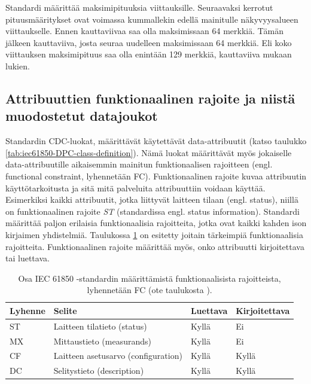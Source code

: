 Standardi määrittää maksimipituuksia viittauksille. Seuraavaksi kerrotut pituusmääritykset ovat voimassa kummallekin edellä mainitulle näkyvyysalueen viittaukselle. Ennen kauttaviivaa saa olla maksimissaan 64 merkkiä. Tämän jälkeen kauttaviiva, josta seuraa uudelleen maksimissaan 64 merkkiä. Eli koko viittauksen maksimipituus saa olla enintään 129 merkkiä, kauttaviiva mukaan lukien. \mbox{\cite[s.~24,183]{IEC61850-7-2}}


\subsection{Attribuuttien funktionaalinen rajoite ja niistä muodostetut datajoukot}
\label{ch:fc-and-dataset}
Standardin CDC-luokat, määrittävät käytettävät data-attribuutit (katso taulukko \ref{tab:iec61850-DPC-class-definition}). Nämä luokat määrittävät myös jokaiselle data-attribuutille aikaisemmin mainitun funktionaalisen rajoitteen (engl. functional constraint, lyhennetään FC). Funktionaalinen rajoite kuvaa attribuutin käyttötarkoitusta ja sitä mitä palveluita attribuuttiin voidaan käyttää. Esimerkiksi kaikki attribuutit, jotka liittyvät laitteen tilaan (engl. status), niillä on funktionaalinen rajoite \emph{ST} (standardissa engl. status information). Standardi määrittää paljon erilaisia funktionaalisia rajoitteita, jotka ovat kaikki kahden ison kirjaimen yhdistelmiä. Taulukossa \ref{tab:iec61850-functional-constraints} on esitetty joitain tärkeimpiä funktionaalisia rajoitteita. Funktionaalinen rajoite määrittää myös, onko attribuutti kirjoitettava tai luettava.

\begin{table}[ht!]
	\caption{Osa IEC 61850 -standardin määrittämistä funktionaalisista rajoitteista, lyhennetään FC (ote taulukosta \mbox{\cite[s.~54]{IEC61850-7-2}}).}
	\label{tab:iec61850-functional-constraints}
	\begin{tabular}{l | l | l | l}
		\hline
		\textbf{Lyhenne} & \textbf{Selite} & \textbf{Luettava} & \textbf{Kirjoitettava} \\
		\hline \hline
		ST & Laitteen tilatieto (status) & Kyllä & Ei \\
		MX & Mittaustieto (measurands) & Kyllä & Ei \\
		CF & Laitteen asetusarvo (configuration) & Kyllä & Kyllä \\
		DC & Selitystieto (description) & Kyllä & Kyllä \\
		\hline
	\end{tabular}
\end{table}

